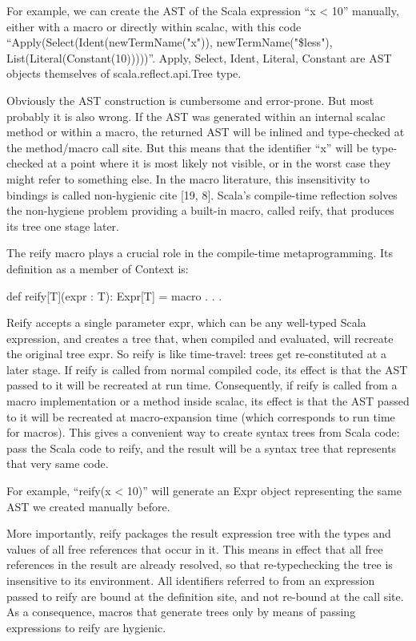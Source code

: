 For example, we can create the AST of the Scala expression ``x < 10'' manually,
either with a macro or directly within scalac, with this code
``Apply(Select(Ident(newTermName("x")), newTermName("\$less"),
List(Literal(Constant(10)))))''. Apply, Select, Ident, Literal, Constant are AST
objects themselves of scala.reflect.api.Tree type.

Obviously the AST construction is cumbersome and error-prone. But most probably
it is also wrong. If the AST was generated within an internal scalac method or
within a macro, the returned AST will be inlined and type-checked at the
method/macro call site. But this means that the identifier ``x'' will be
type-checked at a point where it is most likely not visible, or in the worst
case they might refer to something else. In the macro literature, this
insensitivity to bindings is called non-hygienic {cite [19, 8]}. Scala's
compile-time reflection solves the non-hygiene problem providing a built-in
macro, called reify, that produces its tree one stage later.

The reify macro plays a crucial role in the compile-time metaprogramming. Its
definition as a member of Context is:

def reify[T](expr : T): Expr[T] = macro . . .

Reify accepts a single parameter expr, which can be any well-typed Scala
expression, and creates a tree that, when compiled and evaluated, will recreate
the original tree expr. So reify is like time-travel: trees get re-constituted
at a later stage. If reify is called from normal compiled code, its effect is
that the AST passed to it will be recreated at run time.
Consequently, if reify is called from a macro implementation or a method inside
scalac, its effect is that the AST passed to it will be recreated at
macro-expansion time (which corresponds to run time for macros). This gives a
convenient way to create syntax trees from Scala code: pass the Scala code to
reify, and the result will be a syntax tree that represents that very same code.

For example, ``reify(x < 10)'' will generate an Expr object representing the
same AST we created manually before.

More importantly, reify packages the result expression tree with the types and
values of all free references that occur in it. This means in effect that all
free references in the result are already resolved, so that re-typechecking the
tree is insensitive to its environment. All identifiers referred to from
an expression passed to reify are bound at the definition site, and not re-bound
at the call site. As a consequence, macros that generate trees only by means
of passing expressions to reify are hygienic.

